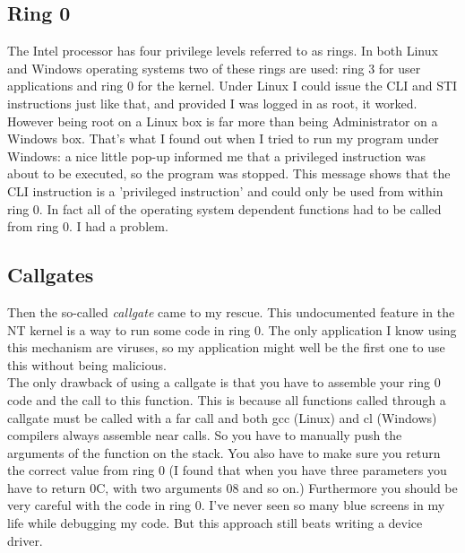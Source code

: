 \subsection{Ring 0}
The Intel processor has four privilege levels referred to as rings. In both
Linux and Windows operating systems two of these rings are used: ring 3 for 
user applications and ring 0 for the kernel. Under Linux I could issue the
CLI and STI instructions just like that, and provided I was logged in as
root, it worked. However being root on a Linux box is far more than being 
Administrator on a Windows box. That's what I found out when I tried to run
my program under Windows: a nice little pop-up informed me that a privileged 
instruction was about to be executed, so the program was stopped. This message
shows that the CLI instruction is a 'privileged instruction' and could only be
used from within ring 0. In fact all of the operating system dependent 
functions had to be called from ring 0. I had a problem.

\subsection{Callgates}
Then the so-called \emph{callgate} \cite{CG}  came to my rescue. This 
undocumented feature in 
the NT kernel is a way to run some code in ring 0. The only application I know
using this mechanism are viruses, so my application might well be the first
one to use this without being malicious. \\
The only drawback of using a callgate is that you have to assemble your ring 0
code and the call to this function. This is because all functions called 
through a callgate must be called with a far call and both gcc (Linux) and
cl (Windows) compilers always assemble near calls. So you have to manually
push the arguments of the function on the stack. You also have to make sure
you return the correct value from ring 0 (I found that when you have three 
parameters you have to return 0C, with two arguments 08 and so on.) Furthermore
you should be very careful with the code in ring 0. I've never seen so many
blue screens in my life while debugging my code. But this approach still beats
writing a device driver.

